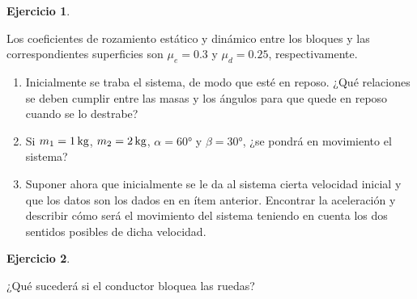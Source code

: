 \documentclass[a4paper,12pt,twoside]{book}
\newtheorem{ejercicio}{{Ejercicio}}[chapter]
\begin{document}
\begin{mdframed}[style=ejercicio-intermedio]
    \begin{ejercicio}
    \end{ejercicio}
    Los coeficientes de rozamiento estático y dinámico entre los bloques y las correspondientes superficies son $\mu_e = 0.3$ y $\mu_d = 0.25$, respectivamente.
    \begin{center}
        \def\svgwidth{0.5\linewidth}
        
    \end{center}
    \begin{enumerate}
        \item Inicialmente se traba el sistema, de modo que esté en reposo. ¿Qué relaciones se deben cumplir entre las masas y los ángulos para que quede en reposo cuando se lo destrabe?
        \item Si $m_1 = 1 \, \si{\kilo\gram}$, $m_2 = 2 \, \si{\kilo\gram}$, $\alpha = \ang{60}$ y $\beta = \ang{30}$, ¿se pondrá en movimiento el sistema?
        \item Suponer ahora que inicialmente se le da al sistema cierta velocidad inicial y que los datos son los dados en en ítem anterior.
        Encontrar la aceleración y describir cómo será el movimiento del sistema teniendo en cuenta los dos sentidos posibles de dicha velocidad.
    \end{enumerate}
\end{mdframed}

\begin{mdframed}[style=ejercicio-facil]
    \begin{ejercicio}
    \end{ejercicio}
    ¿Qué sucederá si el conductor bloquea las ruedas?
\end{mdframed}
\end{document}

